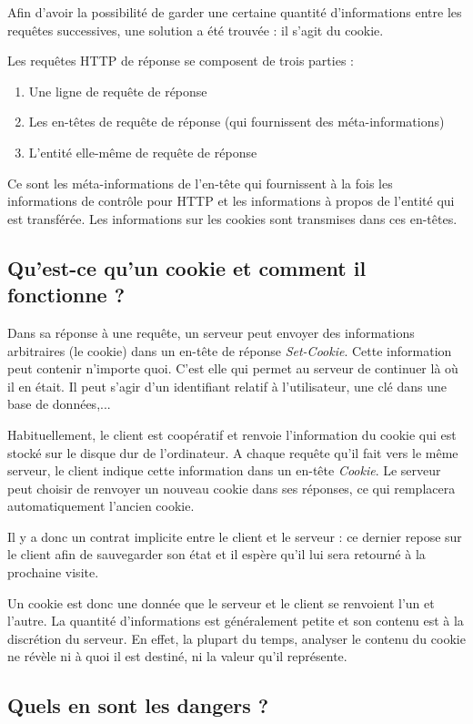 \documentclass[a4paper,12pt,french]{report}
\begin{document}
Afin d'avoir la possibilité de garder une certaine quantité d'informations entre les requêtes successives, une solution a été trouvée : il s'agit du cookie.

Les requêtes HTTP de réponse se composent de trois parties :
\begin{enumerate}
\item Une ligne de requête de réponse
\item Les en-têtes de requête de réponse (qui fournissent des méta-informations)
\item L'entité elle-même de requête de réponse
\end{enumerate}
Ce sont les méta-informations de l'en-tête qui fournissent à la fois les informations de contrôle pour HTTP et les informations à propos de l'entité qui est transférée. Les informations sur les cookies sont transmises dans ces en-têtes.

\subsection{Qu'est-ce qu'un cookie et comment il fonctionne ?}
Dans sa réponse à une requête, un serveur peut envoyer des informations arbitraires (le cookie) dans un en-tête de réponse \textit{Set-Cookie}. Cette information peut contenir n'importe quoi. C'est elle qui permet au serveur de continuer là où il en était. Il peut s'agir d'un identifiant relatif à l'utilisateur, une clé dans une base de données,...

Habituellement, le client est coopératif et renvoie l'information du cookie qui est stocké sur le disque dur de l'ordinateur. A chaque requête qu'il fait vers le même serveur, le client indique cette information dans un en-tête \textit{Cookie}. Le serveur peut choisir de renvoyer un nouveau cookie dans ses réponses, ce qui remplacera automatiquement l'ancien cookie.

Il y a donc un contrat implicite entre le client et le serveur : ce dernier repose sur le client afin de sauvegarder son état et il espère qu'il lui sera retourné à la prochaine visite.

Un cookie est donc une donnée que le serveur et le client se renvoient l'un et l'autre. La quantité d'informations est généralement petite et son contenu est à la discrétion du serveur. En effet, la plupart du temps, analyser le contenu du cookie ne révèle ni à quoi il est destiné, ni la valeur qu'il représente.

\subsection{Quels en sont les dangers ?}
\end{document}
